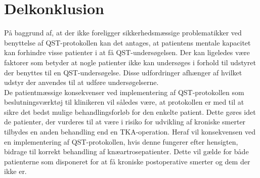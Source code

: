 \section{Delkonklusion}
På baggrund af, at der ikke foreligger sikkerhedsmæssige problematikker ved benyttelse af QST-protokollen kan det antages, at patientens mentale kapacitet kan forhindre visse patienter i at få QST-undersøgelsen. Der kan ligeledes være faktorer som betyder at nogle patienter ikke kan undersøges i forhold til udstyret der benyttes til en QST-undersøgelse. Disse udfordringer afhænger af hvilket udstyr der anvendes til at udføre undersøgelserne.\\
De patientmæssige konsekvenser ved implementering af QST-protokollen som beslutningsværktøj til klinikeren vil således være, at protokollen er med til at sikre det bedst mulige behandlingsforløb for den enkelte patient. Dette gøres idet de patienter, der vurderes til at være i risiko for udvikling af kroniske smerter tilbydes en anden behandling end en TKA-operation. Heraf vil konsekvensen ved en implementering af QST-protokollen, hvis denne fungerer efter hensigten, bidrage til korrekt behandling af knæartrosepatienter. Dette vil gælde for både patienterne som disponeret for at få kroniske postoperative smerter og dem der ikke er.



